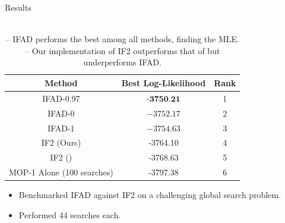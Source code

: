 \documentclass{beamer}
\begin{document}
\begin{frame}{Results}
    
    \begin{table}[h!]
        \centering
        \begin{tabular}{||c c c||} 
         \hline
         Method & Best Log-Likelihood & Rank \\ [0.5ex] 
         \hline\hline
         IFAD-0.97 & $\textbf{-3750.21}$ & 1\\
         IFAD-0 & $-3752.17$ & 2\\
         IFAD-1 & $-3754.63$ & 3\\
         IF2 (Ours) & -3764.10 & 4\\
         IF2 (\cite{ionides15}) & -3768.63 & 5\\ 
         MOP-1 Alone (100 searches) & -3797.38 & 6\\
         \hline

        \end{tabular}
        \caption{\\
        -- IFAD performs the best among all methods, finding the MLE. \\
        -- Our implementation of IF2 outperforms that of \cite{ionides15} but underperforms IFAD.}
        \label{table:mle}
    \end{table}
    
    \begin{itemize}
        \item Benchmarked IFAD against IF2 on a challenging global search problem. 
        \item \pause Performed 44 searches each. 
    \end{itemize}
    
\end{frame}
\end{document}
